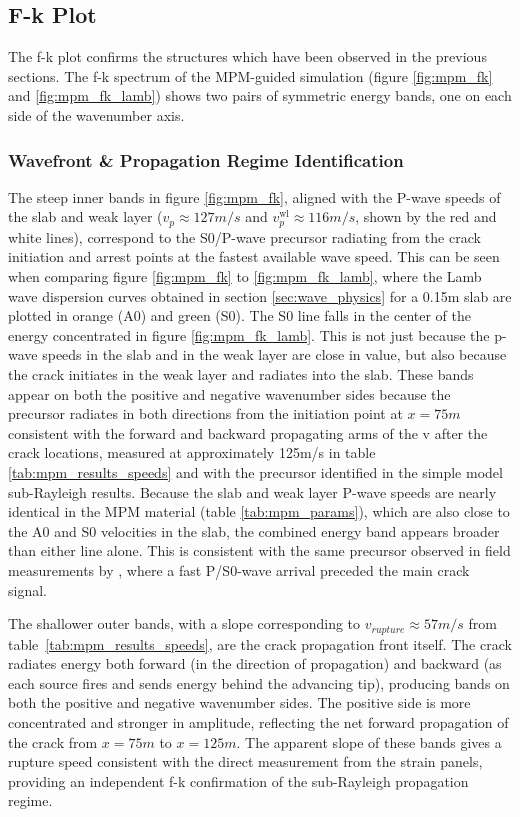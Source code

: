 \subsection{F-k Plot}
The f-k plot confirms the structures which have been observed in the previous sections. The f-k spectrum of the MPM-guided simulation (figure \ref{fig:mpm_fk} and \ref{fig:mpm_fk_lamb}) shows two pairs of symmetric energy bands, one on each side of the wavenumber axis.\par

\subsubsection{Wavefront \& Propagation Regime Identification}
The steep inner bands in figure \ref{fig:mpm_fk}, aligned with the P-wave speeds of the slab and weak layer ($v_p \approx 127m/s$ and $v_p^{\text{wl}} \approx 116 m/s$, shown by the red and white lines), correspond to the S0/P-wave precursor radiating from the crack initiation and arrest points at the fastest available wave speed. This can be seen when comparing figure \ref{fig:mpm_fk} to \ref{fig:mpm_fk_lamb}, where the Lamb wave dispersion curves obtained in section \ref{sec:wave_physics} for a 0.15m slab are plotted in orange (A0) and green (S0). The S0 line falls in the center of the energy concentrated in figure \ref{fig:mpm_fk_lamb}. This is not just because the p-wave speeds in the slab and in the weak layer are close in value, but also because the crack initiates in the weak layer and radiates into the slab. These bands appear on both the positive and negative wavenumber sides because the precursor radiates in both directions from the initiation point at $x = 75m $\, consistent with the forward and backward propagating arms of the v after the crack locations, measured at approximately 125m/s in table \ref{tab:mpm_results_speeds} and with the precursor identified in
the simple model sub-Rayleigh results. Because the slab and weak layer
P-wave speeds are nearly identical in the MPM material
(table \ref{tab:mpm_params}), which are also close to the A0 and S0 velocities in the slab, the combined energy band appears broader than either line alone. This is consistent with the same precursor observed in field measurements by \textcite{herwijnenSeismicSensorArray2011}, where a fast P/S0-wave arrival preceded the main crack signal. \par


The shallower outer bands, with a slope corresponding to
$v_{rupture} \approx 57m/s$ from table~\ref{tab:mpm_results_speeds}, are the crack propagation front itself. The crack radiates energy both forward
(in the direction of propagation) and backward (as each source fires and
sends energy behind the advancing tip), producing bands on both the
positive and negative wavenumber sides. The positive side is more
concentrated and stronger in amplitude, reflecting the net forward
propagation of the crack from $x = 75m$ to $x = 125m$. The apparent
slope of these bands gives a rupture speed consistent with the direct
measurement from the strain panels, providing an independent f-k
confirmation of the sub-Rayleigh propagation regime. \par

